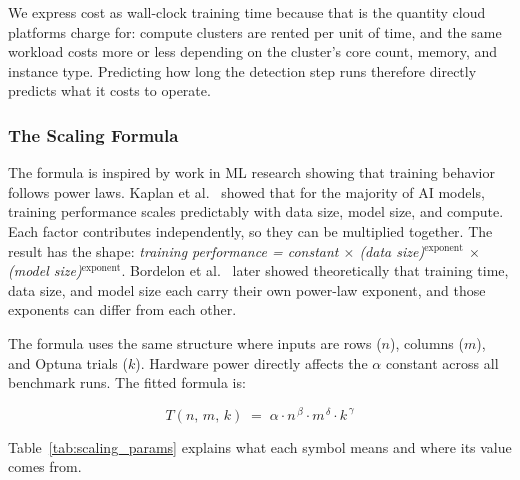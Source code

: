 \documentclass[12pt]{article}
\begin{document}
We express cost as wall-clock training time because that is the quantity cloud platforms charge for: compute clusters are rented per unit of time, and the same workload costs more or less depending on the cluster's core count, memory, and instance type. Predicting how long the detection step runs therefore directly predicts what it costs to operate.

\subsubsection{The Scaling Formula}

The formula is inspired by work in ML research showing that training behavior follows power laws. Kaplan et al.\ \cite{kaplan2020scalinglawsneurallanguage} showed that for the majority of AI models, training performance scales predictably with data size, model size, and compute. Each factor contributes independently, so they can be multiplied together. The result has the shape: \emph{training performance = constant $\times$ (data size)$^\text{exponent}$ $\times$ (model size)$^\text{exponent}$}. Bordelon et al.\ \cite{pmlr-v235-bordelon24a} later showed theoretically that training time, data size, and model size each carry their own power-law exponent, and those exponents can differ from each other.

The formula uses the same structure where inputs are rows ($n$), columns ($m$), and Optuna trials ($k$). Hardware power directly affects the $\alpha$ constant across all benchmark runs. The fitted formula is:

$$T(n,\, m,\, k) \;=\; \alpha \cdot n^{\,\beta} \cdot m^{\,\delta} \cdot k^{\,\gamma}$$

Table~\ref{tab:scaling_params} explains what each symbol means and where its value comes from.
\end{document}
